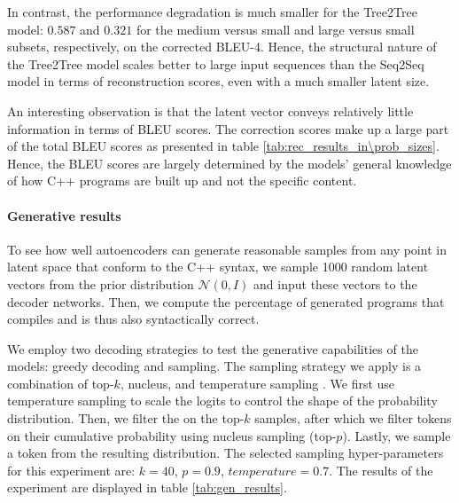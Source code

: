 In contrast, the performance degradation is much smaller for the Tree2Tree model:  $0.587$ and $0.321$ for the medium versus small and large versus small subsets, respectively, on the corrected BLEU-4. Hence, the structural nature of the Tree2Tree model scales better to large input sequences than the Seq2Seq model in terms of reconstruction scores, even with a much smaller latent size. 



An interesting observation is that the latent vector conveys relatively little information in terms of BLEU scores. The correction scores make up a large part of the total BLEU scores as presented in table \ref{tab:rec_results_in\prob_sizes}. Hence, the BLEU scores are largely determined by the models' general knowledge of how C++ programs are built up and not the specific content.

\paragraph{Generative results}
\label{results:gen}
To see how well autoencoders can generate reasonable samples from any point in latent space that conform to the C++ syntax, we sample 1000 random latent vectors from the prior distribution $\mathcal{N}(0, I)$ and input these vectors to the decoder networks. Then, we compute the percentage of generated programs that compiles and is thus also syntactically correct.



We employ two decoding strategies to test the generative capabilities of the models: greedy decoding and sampling. The sampling strategy we apply is a combination of top-$k$, nucleus, and temperature sampling \cite{holtzman2019curious}. We first use temperature sampling to scale the logits to control the shape of the probability distribution. Then, we filter the on the top-$k$ samples, after which we filter tokens on their cumulative probability using nucleus sampling (top-$p$). Lastly, we sample a token from the resulting distribution. The selected sampling hyper-parameters for this experiment are: $k=40$, $p=0.9$, $temperature=0.7$. The results of the experiment are displayed in table \ref{tab:gen_results}.

